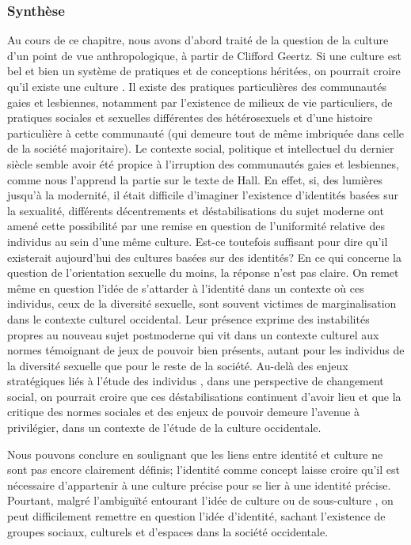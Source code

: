 \subsubsection{Synthèse}
\label{sec:synth_se} 
Au cours de ce chapitre, nous avons d'abord traité de la question de la culture d'un point de vue anthropologique, à partir de Clifford Geertz.
Si une culture est bel et bien un système de pratiques et de conceptions héritées, on pourrait croire qu'il existe une culture \lgbt{}. 
Il existe des pratiques particulières des communautés gaies et lesbiennes, notamment par l'existence de milieux de vie particuliers, de pratiques sociales et sexuelles différentes des hétérosexuels et d'une histoire particulière à cette communauté (qui demeure tout de même imbriquée dans celle de la société majoritaire).
Le contexte social, politique et intellectuel du dernier siècle semble avoir été propice à l'irruption des communautés gaies et lesbiennes, comme nous l'apprend la partie sur le texte de Hall. 
En effet, si, des lumières jusqu'à la modernité, il était difficile d'imaginer l'existence d'identités basées sur la sexualité, différents décentrements et déstabilisations du sujet moderne ont amené cette possibilité par une remise en question de l'uniformité relative des individus au sein d'une même culture. 
Est-ce toutefois suffisant pour dire qu'il existerait aujourd'hui des cultures basées sur des identités? 
En ce qui concerne la question de l'orientation sexuelle du moins, la réponse n'est pas claire. 
On remet même en question l'idée de s'attarder à l'identité dans un contexte où ces individus, ceux de la diversité sexuelle, sont souvent victimes de marginalisation dans le contexte culturel occidental. 
Leur présence exprime des instabilités propres au nouveau sujet postmoderne qui vit dans un contexte culturel aux normes témoignant de jeux de pouvoir bien présents, autant pour les individus de la diversité sexuelle que pour le reste de la société. 
Au-delà des enjeux stratégiques liés à l'étude des individus \lgbt{}, dans une perspective de changement social, on pourrait croire que ces déstabilisations continuent d'avoir lieu et que la critique des normes sociales et des enjeux de pouvoir demeure l'avenue à privilégier, dans un contexte de l'étude de la culture occidentale.

Nous pouvons conclure en soulignant que les liens entre identité et culture ne sont pas encore clairement définis; l'identité comme concept laisse croire qu'il est nécessaire d'appartenir à une culture précise pour se lier à une identité précise. 
Pourtant, malgré l'ambiguïté entourant l'idée de culture ou de sous-culture \lgbt{}, on peut difficilement remettre en question l'idée d'identité, sachant l'existence de groupes sociaux, culturels et d'espaces \lgbt{} dans la société occidentale.

